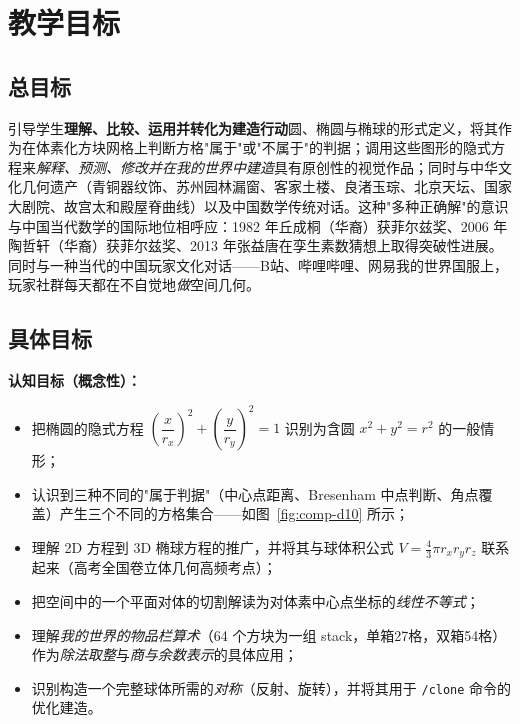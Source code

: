 \documentclass[12pt,a4paper]{scrartcl}
\newcommand{\acc}[1]{\textcolor{accent}{\textbf{#1}}}
\newcommand{\cmd}[1]{\textcolor{earth}{\texttt{\small #1}}}
\begin{document}
\section{教学目标}\label{sec:objetivos}

\subsection{总目标}

引导学生\acc{理解、比较、运用并转化为建造行动}圆、椭圆与椭球的形式定义，将其作为在体素化方块网格上判断方格"属于"或"不属于"的判据；调用这些图形的隐式方程来\emph{解释、预测、修改并在我的世界中建造}具有原创性的视觉作品；同时与中华文化几何遗产（青铜器纹饰、苏州园林漏窗、客家土楼、良渚玉琮、北京天坛、国家大剧院、故宫太和殿屋脊曲线）以及中国数学传统对话。这种"多种正确解"的意识与中国当代数学的国际地位相呼应：1982 年丘成桐（华裔）获菲尔兹奖、2006 年陶哲轩（华裔）获菲尔兹奖、2013 年张益唐在孪生素数猜想上取得突破性进展。同时与一种当代的中国玩家文化对话——B站、哔哩哔哩、网易我的世界国服上，玩家社群每天都在不自觉地\emph{做}空间几何。

\subsection{具体目标}

\textbf{认知目标（概念性）：}
\begin{itemize}[leftmargin=1.3em,itemsep=0.2em,topsep=0.3em]
  \item 把椭圆的隐式方程 $\left(\dfrac{x}{r_x}\right)^{\!2} + \left(\dfrac{y}{r_y}\right)^{\!2} = 1$ 识别为含圆 $x^2 + y^2 = r^2$ 的一般情形；
  \item 认识到三种不同的"属于判据"（中心点距离、Bresenham 中点判断、角点覆盖）产生三个不同的方格集合——如图~\ref{fig:comp-d10} 所示；
  \item 理解 2D 方程到 3D 椭球方程的推广，并将其与球体积公式 $V = \tfrac{4}{3}\pi r_x r_y r_z$ 联系起来（高考全国卷立体几何高频考点）；
  \item 把空间中的一个平面对体的切割解读为对体素中心点坐标的\emph{线性不等式}；
  \item 理解\emph{我的世界的物品栏算术}（64 个方块为一组 stack，单箱27格，双箱54格）作为\emph{除法取整}与\emph{商与余数表示}的具体应用；
  \item 识别构造一个完整球体所需的\emph{对称}（反射、旋转），并将其用于 \cmd{/clone} 命令的优化建造。
\end{itemize}
\end{document}
